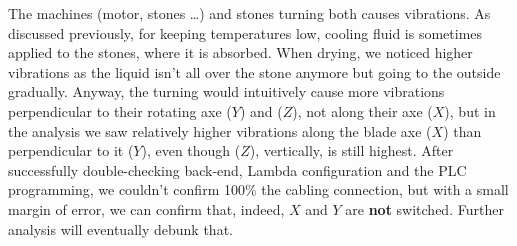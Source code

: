 The machines (motor, stones \dots) and stones turning both causes vibrations. As discussed previously, for keeping temperatures low, cooling fluid is sometimes applied to the stones, 
where it is absorbed. When drying, we noticed higher vibrations as the liquid isn't all over the stone anymore but going to the outside gradually.
Anyway, the turning would intuitively cause more vibrations perpendicular to their rotating axe ($Y$) and ($Z$), not along their axe ($X$), 
but in the analysis we saw relatively higher vibrations along the blade axe ($X$) than perpendicular to it ($Y$), even though ($Z$), vertically, is still highest. 
After successfully double-checking back-end, Lambda configuration and the \ac{PLC} programming, we couldn't confirm 100\% the cabling connection, but with a small margin of 
error, we can confirm that, indeed, $X$ and $Y$ are \textbf{not} switched. Further analysis will eventually debunk that. 


